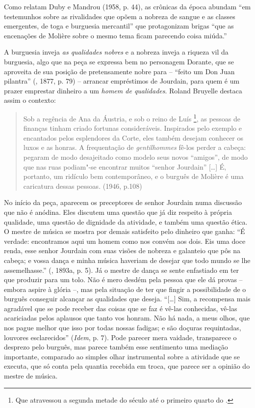 Como relatam Duby e Mandrou (1958, p. 44), as crônicas da época abundam
``em testemunhos sobre as rivalidades que opõem a nobreza de sangue e as
classes emergentes, de toga e burguesia mercantil'' que protagonizam
brigas ``que as encenações de Molière sobre o mesmo tema ficam parecendo
coisa miúda.''

A burguesia inveja \emph{as qualidades nobres} e a nobreza inveja a
riqueza vil da burguesia, algo que na peça se expressa bem no personagem
Dorante, que se aproveita de sua posição de pretensamente nobre para --
``feito um Don Juan pilantra'' (, 1877, p. 79) -- arrancar
empréstimos de Jourdain, para quem é um prazer emprestar dinheiro a um
\emph{homem de qualidades}. Roland Bruyelle destaca assim o contexto:

\begin{quote}
Sob a regência de Ana da Áustria, e sob o reino de Luís \footnote{Que
  atravessou a segunda metade do século  até o primeiro quarto do
  .}, as pessoas de finanças tinham criado fortunas consideráveis.
Inspirados pelo exemplo e encantados pelos esplendores da Corte, eles
também desejam conhecer os luxos e as honras. A frequentação de
\emph{gentilhommes} fê-los perder a cabeça: pegaram de modo desajeitado
como modelo seus novos ``amigos'', de modo que nas ruas podiam"-se
encontrar muitos ``senhor Jourdain'' [\ldots{}] É, portanto, um
ridículo bem contemporâneo, e o burguês de Molière é uma caricatura
dessas pessoas. (1946, p.108)
\end{quote}

No início da peça, aparecem os preceptores de senhor Jourdain numa
discussão que não é anódina. Eles discutem uma questão que já diz
respeito à própria qualidade, uma questão de dignidade da atividade, e
também uma questão ética. O mestre de música se mostra por demais
satisfeito pelo dinheiro que ganha: ``É verdade: encontramos aqui um
homem como nos convém aos dois. Eis uma doce renda, esse senhor Jourdain
com suas visões de nobreza e galanteio que pôs na cabeça; e vossa dança
e minha música haveriam de desejar que todo mundo se lhe assemelhasse.''
(, 1893a, p. 5). Já o mestre de dança se sente enfastiado em ter
que produzir para um tolo. Não é mero desdém pela pessoa que ele dá
provas -- embora aspire à glória --, mas pela situação de ter que fingir
a possibilidade de o burguês conseguir alcançar as qualidades que
deseja. ``[\ldots{}] Sim, a recompensa mais agradável que se pode receber
das coisas que se faz é vê-las conhecidas, vê-las acariciadas pelos
aplausos que tanto vos honram. Não há nada, a meus olhos, que nos pague
melhor que isso por todas nossas fadigas; e são doçuras requintadas,
louvores esclarecidos'' (\emph{Idem}, p. 7). Pode parecer mera vaidade,
transparece o desprezo pelo burguês, mas parece também esse sentimento
uma mediação importante, comparado ao simples olhar instrumental sobre a
atividade que se executa, que só conta pela quantia recebida em troca,
que parece ser a opinião do mestre de música.

